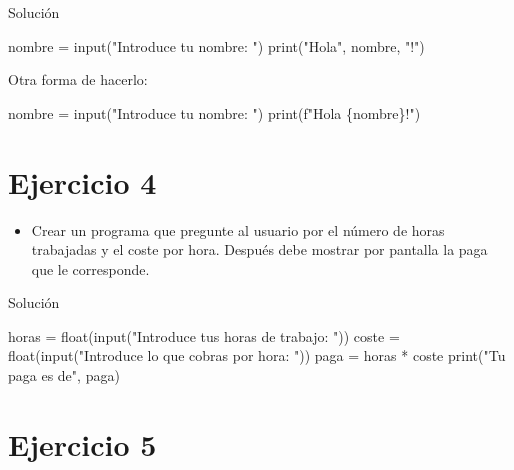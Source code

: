 \documentclass[
  a4paper,
  DIV=11,
  numbers=noendperiod,
  onepage,
  openany]{scrreprt}
\newenvironment{Shaded}{\begin{snugshade}}{\end{snugshade}}
\newcommand{\BuiltInTok}[1]{\textcolor[rgb]{0.00,0.23,0.31}{#1}}
\newcommand{\NormalTok}[1]{\textcolor[rgb]{0.00,0.23,0.31}{#1}}
\newcommand{\OperatorTok}[1]{\textcolor[rgb]{0.37,0.37,0.37}{#1}}
\newcommand{\SpecialCharTok}[1]{\textcolor[rgb]{0.37,0.37,0.37}{#1}}
\newcommand{\SpecialStringTok}[1]{\textcolor[rgb]{0.13,0.47,0.30}{#1}}
\newcommand{\StringTok}[1]{\textcolor[rgb]{0.13,0.47,0.30}{#1}}
\providecommand{\tightlist}{%
  \setlength{\itemsep}{0pt}\setlength{\parskip}{0pt}}\usepackage{longtable,booktabs,array}
\begin{document}
\begin{tcolorbox}
Solución

\begin{Shaded}
\begin{Highlighting}[]
\NormalTok{nombre }\OperatorTok{=} \BuiltInTok{input}\NormalTok{(}\StringTok{"Introduce tu nombre: "}\NormalTok{)}
\BuiltInTok{print}\NormalTok{(}\StringTok{"Hola"}\NormalTok{, nombre, }\StringTok{"!"}\NormalTok{)}
\end{Highlighting}
\end{Shaded}

Otra forma de hacerlo:

\begin{Shaded}
\begin{Highlighting}[]
\NormalTok{nombre }\OperatorTok{=} \BuiltInTok{input}\NormalTok{(}\StringTok{"Introduce tu nombre: "}\NormalTok{)}
\BuiltInTok{print}\NormalTok{(}\SpecialStringTok{f"Hola }\SpecialCharTok{\{}\NormalTok{nombre}\SpecialCharTok{\}}\SpecialStringTok{!"}\NormalTok{)}
\end{Highlighting}
\end{Shaded}

\section{Ejercicio 4}\label{ejercicio-4-1}

\begin{itemize}
\tightlist
\item
  Crear un programa que pregunte al usuario por el número de horas
  trabajadas y el coste por hora. Después debe mostrar por pantalla la
  paga que le corresponde.
\end{itemize}

Solución

\begin{Shaded}
\begin{Highlighting}[]
\NormalTok{horas }\OperatorTok{=} \BuiltInTok{float}\NormalTok{(}\BuiltInTok{input}\NormalTok{(}\StringTok{"Introduce tus horas de trabajo: "}\NormalTok{))}
\NormalTok{coste }\OperatorTok{=} \BuiltInTok{float}\NormalTok{(}\BuiltInTok{input}\NormalTok{(}\StringTok{"Introduce lo que cobras por hora: "}\NormalTok{))}
\NormalTok{paga }\OperatorTok{=}\NormalTok{ horas }\OperatorTok{*}\NormalTok{ coste}
\BuiltInTok{print}\NormalTok{(}\StringTok{"Tu paga es de"}\NormalTok{, paga)}
\end{Highlighting}
\end{Shaded}

\section{Ejercicio 5}\label{ejercicio-5-1}


\end{tcolorbox}
\end{document}
